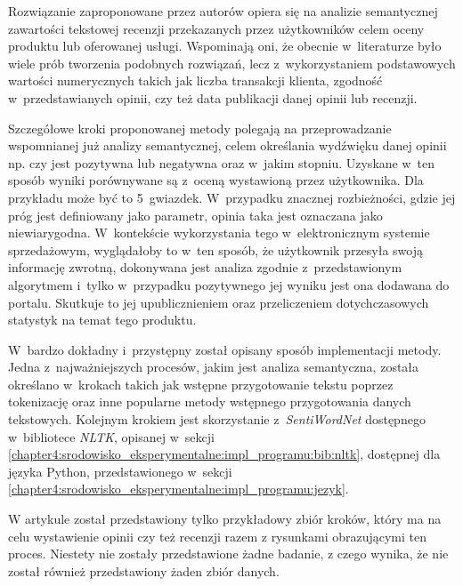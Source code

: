 \documentclass[../Kamil_Kowalewski_Main.tex]{subfiles}
\begin{document}
{{        Rozwiązanie zaproponowane przez autorów opiera się na analizie semantycznej
        zawartości tekstowej recenzji przekazanych przez użytkowników celem oceny
        produktu lub oferowanej usługi. Wspominają oni, że obecnie w~literaturze było
        wiele prób tworzenia podobnych rozwiązań, lecz z~wykorzystaniem podstawowych
        wartości numerycznych takich jak liczba transakcji klienta, zgodność
        w~przedstawianych opinii, czy też data publikacji danej opinii lub recenzji.

        Szczegółowe kroki proponowanej metody polegają na przeprowadzanie wspomnianej
        już analizy semantycznej, celem określania wydźwięku danej opinii np. czy jest
        pozytywna lub negatywna oraz w~jakim stopniu. Uzyskane w~ten sposób wyniki
        porównywane są z~oceną wystawioną przez użytkownika. Dla przykładu może być to
        5~gwiazdek. W~przypadku znacznej rozbieżności, gdzie jej próg jest definiowany
        jako parametr, opinia taka jest oznaczana jako niewiarygodna. W~kontekście
        wykorzystania tego w~elektronicznym systemie sprzedażowym, wyglądałoby to w~ten
        sposób, że użytkownik przesyła swoją informację zwrotną, dokonywana jest
        analiza zgodnie z~przedstawionym algorytmem i~tylko w~przypadku pozytywnego jej
        wyniku jest ona dodawana do portalu. Skutkuje to jej upublicznieniem oraz
        przeliczeniem dotychczasowych statystyk na temat tego produktu.

        W~bardzo dokładny i~przystępny został opisany sposób implementacji metody.
        Jedna z~najważniejszych procesów, jakim jest analiza semantyczna, została
        określano w~krokach takich jak wstępne przygotowanie tekstu poprzez tokenizację
        oraz inne popularne metody wstępnego przygotowania danych tekstowych. Kolejnym
        krokiem jest skorzystanie z~\textit{SentiWordNet} dostępnego w~bibliotece
        \textit{NLTK}, opisanej w~sekcji
        \ref{chapter4:srodowisko_eksperymentalne:impl_programu:bib:nltk}, dostępnej dla
        języka Python, przedstawionego w~sekcji
        \ref{chapter4:srodowisko_eksperymentalne:impl_programu:jezyk}.

        W artykule został przedstawiony tylko przykładowy zbiór kroków, który
        ma na celu wystawienie opinii czy też recenzji razem z rysunkami obrazującymi
        ten proces. Niestety nie zostały przedstawione żadne badanie, z czego wynika, że
        nie został również przedstawiony żaden zbiór danych.

}}
\end{document}
